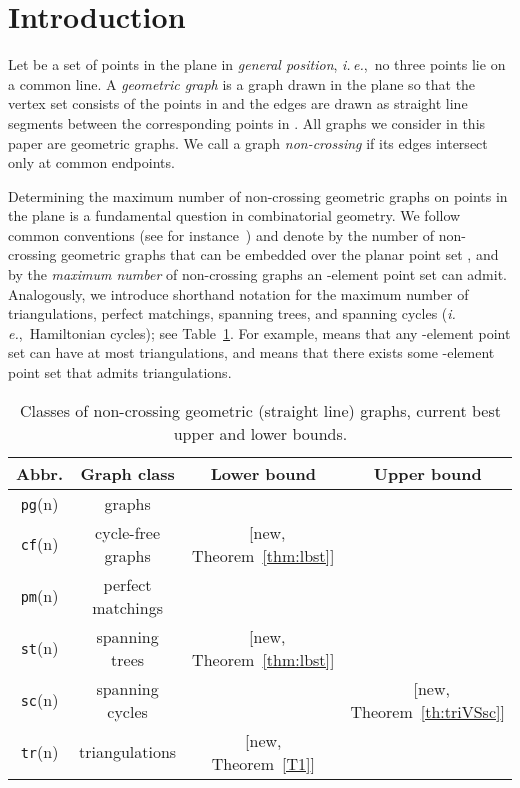 \documentclass[11pt]{article}
\def\ie{{\it i.\,e.},~}
\def\tr{{\tt tr}}
\def\sc{{\tt sc}}
\def\st{{\tt st}}
\def\cf{{\tt cf}}
\def\pm{{\tt pm}}
\def\pg{{\tt pg}}
\begin{document}
\section{Introduction}

Let  be a set of  points in the plane in {\em general position},
\ie no three points lie on a common line.
A {\em geometric graph}  is a graph drawn in the plane so
that the vertex set consists of the points in  and the edges
are drawn as straight line segments between the corresponding points in .
All graphs we consider in this paper are geometric graphs. We call a
 graph \emph{non-crossing} if its edges intersect only at common endpoints.

Determining the maximum number of non-crossing geometric graphs on 
points in the plane is a fundamental question in combinatorial geometry.
We follow common conventions (see for instance~\cite{SW06})
and denote by  the number of non-crossing
geometric graphs that can be embedded over the planar point set , and by  the {\em maximum number}
of non-crossing graphs an -element point set can admit.
Analogously, we introduce shorthand notation for the maximum number of
triangulations, perfect matchings, spanning trees, and spanning cycles
(\ie Hamiltonian cycles); see Table~\ref{table1}.
For example,  means that any -element point set
can have at most  triangulations, and 
means that there exists some -element point set that admits 
triangulations.

\begin{table}[h]
\begin{center}
\begin{tabular}{|c|c|c|c|}
\hline
{\textbf {Abbr.}} & {\textbf {Graph class}} & {\textbf {Lower bound}}
& {\textbf {Upper bound}} \\
\hline\hline
\pg(n) & graphs &
~\cite{AHV+06,GNT00} & ~\cite{HSSTW11,SS10}\\
\hline
\cf(n) & cycle-free graphs & ~[new, Theorem~\ref{thm:lbst}] & ~\cite{HSSTW11,SS10}\\
\hline
\pm(n) & perfect matchings & ~\cite{GNT00} & ~\cite{SW06} \\
\hline
\st(n) & spanning trees & ~[new, Theorem~\ref{thm:lbst}] & ~\cite{HSSTW11,SS10} \\
\hline	
\sc(n) & spanning cycles & ~\cite{GNT00} & ~[new, Theorem~\ref{th:triVSsc}]\\
\hline
\tr(n) & triangulations &  [new, Theorem~\ref{T1}]& ~\cite{SS10} \\
\hline
\end{tabular}
\caption{Classes of non-crossing geometric (straight line) graphs, current best
  upper and lower bounds.\label{table1}}
\end{center}
\vspace{-\baselineskip}
\end{table}
\end{document}
